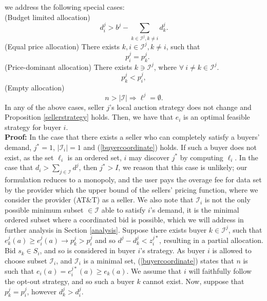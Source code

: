 \documentclass[12pt]{article}
\theoremstyle{definition}
\newcommand{\mcI}{\mathcal{I}}
\begin{document}
\begin{multicols}{2}
{we address the following special cases:\\
(Budget limited allocation)
\begin{equation}\label{partialallocation}
    d_i^j > b^j - \sum_{k\in\mcI^j, k\ne i} d_k^j.
\end{equation}
(Equal price allocation)
There exists $k,i \in \mcI^j, k\ne i$, such that
\begin{equation}\label{equalprice}
    \quad p_i^j = p_k^j.
\end{equation}
(Price-dominant allocation)
There exists $k \ni \mcI^j$, where $\forall \ i\ne k \in \mcI^j$.
\begin{equation}\label{newbuyer}
    p_k^j < p_i^j, 
\end{equation}
(Empty allocation)
\begin{equation}\label{emptyset}
    n > \vert \mcI\vert \Rightarrow \ell^j = \emptyset.
\end{equation}
In any of the above cases, seller $j$'s local auction strategy does not change and
Proposition \ref{sellerstrategy} holds.
Then, we have that $e_i$
is an optimal feasible strategy for buyer $i$.
}\\
\textbf{Proof:}
In the case that there exists a seller who can completely satisfy a buyers'
demand, $j^*=1$, $\vert \mcI_i\vert =1$ and (\ref{buyercoordinate}) holds. If such a buyer does not exist,
as the set $\ell_i$ is an ordered set, $i$ may discover 
$j^*$ by computing $\ell_i$. In the case that $d_i >
\sum_{j\in\mcI}d^j$, then $j^* > I$, we reason that this case is unlikely; our formulation reduces to a
monopoly, and the user pays the overage fee for data set by the provider which the upper bound of the sellers'
pricing function, where we consider the provider (AT\&T) as a seller. We also note that $\mcI_i$ is not the only
possible minimum subset $\in\mcI$ able to satisfy $i$'s demand, it is the
minimal ordered subset where a
coordinated bid is possible, which we will address in further analysis in Section \ref{analysis}.
Suppose there exists buyer $k\in \mcI^j$, such that
$e_k^j(a) \ge e_i^j(a)
\rightarrow p_k^j > p_i^{j}$ and so $d^j - d_k^j < z_i^{j*}$, resulting in a
partial allocation. Bid $s_k \in S_i$, and so is considered in buyer $i$'s strategy. 
As buyer $i$ is allowed to choose subset $\mcI_i$, and $\mcI_i$ is a minimal
set, (\ref{buyercoordinate}) states that $n$ is such that $e_i(a) = e_i^{j*}(a)
\ge e_k(a)$. We assume that $i$ will faithfully follow the opt-out strategy, and
so such a buyer $k$ cannot exist. 
Now, suppose that $p_k^j = p_i^j$, however $d_k^j > d_i^j$.


\end{multicols}
\end{document}
